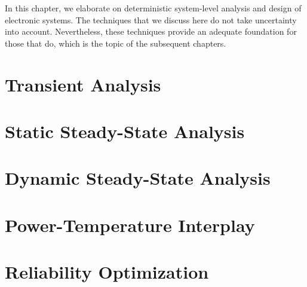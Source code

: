 In this chapter, we elaborate on deterministic system-level analysis and design
of electronic systems. The techniques that we discuss here do not take
uncertainty into account. Nevertheless, these techniques provide an adequate
foundation for those that do, which is the topic of the subsequent chapters.

\section{\introductiontitle}

\section{Transient Analysis}

\section{Static Steady-State Analysis}

\section{Dynamic Steady-State Analysis}

\section{Power-Temperature Interplay}

\section{Reliability Optimization}

\section{\conclusiontitle}
